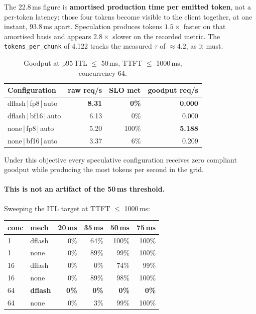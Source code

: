 \documentclass[11pt]{article}
\newcommand{\tw}[1]{\texttt{\small #1}}
\begin{document}
\noindent
The 22.8\,ms figure is \textbf{amortised production time per emitted token},
not a per-token latency: those four tokens become visible to the client
together, at one instant, 93.8\,ms apart. Speculation produces tokens
$1.5\times$ faster on that amortised basis and appears $2.8\times$ slower on
the recorded metric. The \tw{tokens\_per\_chunk} of 4.122 tracks the
measured $\tau$ of ${\approx}4.2$, as it must.

\begin{table}[h]\centering\small
\caption{Goodput at p95 ITL $\le$ 50\,ms, TTFT $\le$ 1000\,ms, concurrency 64.}
\begin{tabular}{lrrr}
\toprule
Configuration & raw req/s & SLO met & goodput req/s\\
\midrule
dflash\,|\,fp8\,|\,auto & \textbf{8.31} & \textbf{0\%} & \textbf{0.000}\\
dflash\,|\,bf16\,|\,auto & 6.13 & 0\% & 0.000\\
none\,|\,fp8\,|\,auto & 5.20 & 100\% & \textbf{5.188}\\
none\,|\,bf16\,|\,auto & 3.37 & 6\% & 0.209\\
\bottomrule
\end{tabular}
\end{table}

\noindent
Under this objective every speculative configuration receives zero compliant
goodput while producing the most tokens per second in the grid.

\paragraph{This is not an artifact of the 50\,ms threshold.} Sweeping the
ITL target at TTFT $\le$ 1000\,ms:

\begin{table}[h]\centering\small
\begin{tabular}{llrrrr}
\toprule
conc & mech & 20\,ms & 35\,ms & 50\,ms & 75\,ms\\
\midrule
1 & dflash & 0\% & 64\% & 100\% & 100\%\\
1 & none & 0\% & 89\% & 99\% & 100\%\\
16 & dflash & 0\% & 0\% & 74\% & 99\%\\
16 & none & 0\% & 89\% & 98\% & 100\%\\
64 & \textbf{dflash} & \textbf{0\%} & \textbf{0\%} & \textbf{0\%} & \textbf{0\%}\\
64 & none & 0\% & 3\% & 99\% & 100\%\\
\bottomrule
\end{tabular}
\end{table}
\end{document}
